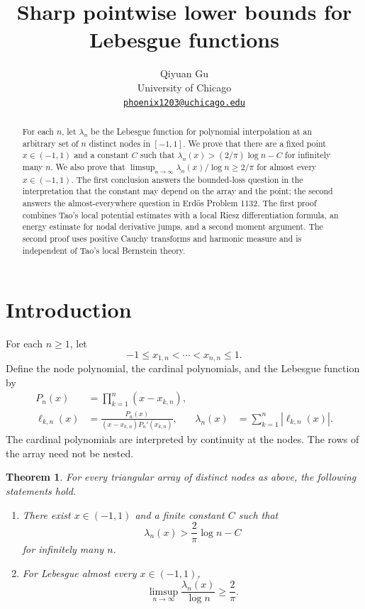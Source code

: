 \documentclass[11pt]{article}
\title{Sharp pointwise lower bounds for Lebesgue functions}
\author{Qiyuan Gu\\
University of Chicago\\
\href{mailto:phoenix1203@uchicago.edu}{\texttt{phoenix1203@uchicago.edu}}}
\date{}
\newtheorem{theorem}{Theorem}
\numberwithin{equation}{section}
\begin{document}
\maketitle

\begin{abstract}
For each \(n\), let \(\lambda_n\) be the Lebesgue function for
polynomial interpolation at an arbitrary set of \(n\) distinct nodes
in \([-1,1]\). We prove that there are a fixed point \(x\in(-1,1)\)
and a constant \(C\) such that
\(\lambda_n(x)>(2/\pi)\log n-C\) for infinitely many \(n\).
We also prove that
\(\limsup_{n\to\infty}\lambda_n(x)/\log n\ge 2/\pi\)
for almost every \(x\in(-1,1)\).
The first conclusion answers the bounded-loss question in the interpretation
that the constant may depend on the array and the point; the second answers
the almost-everywhere question in Erd\H{o}s Problem 1132. The first proof
combines Tao's local potential estimates with a local Riesz differentiation
formula, an energy estimate for nodal derivative jumps, and a second moment
argument. The second proof uses positive Cauchy transforms and harmonic
measure and is independent of Tao's local Bernstein theory.
\end{abstract}

\section{Introduction}

For each \(n\ge1\), let
\[
 -1\le x_{1,n}<\cdots<x_{n,n}\le1.
\]
Define the node polynomial, the cardinal polynomials, and the Lebesgue
function by
\begin{align*}
 P_n(x)&=\prod_{k=1}^n(x-x_{k,n}),\\
 \ell_{k,n}(x)&=\frac{P_n(x)}{(x-x_{k,n})P_n'(x_{k,n})},
 &\lambda_n(x)&=\sum_{k=1}^n|\ell_{k,n}(x)|.
\end{align*}
The cardinal polynomials are interpreted by continuity at the nodes.
The rows of the array need not be nested.

\begin{theorem}\label{thm:main}
For every triangular array of distinct nodes as above, the following
statements hold.
\begin{enumerate}
\item[(i)] There exist \(x\in(-1,1)\) and a finite constant \(C\) such that
\begin{equation}\label{eq:main-fixed}
 \lambda_n(x)>\frac2\pi\log n-C
\end{equation}
for infinitely many \(n\).
\item[(ii)] For Lebesgue almost every \(x\in(-1,1)\),
\begin{equation}\label{eq:main-ae}
 \limsup_{n\to\infty}\frac{\lambda_n(x)}{\log n}\ge\frac2\pi.
\end{equation}
\end{enumerate}
\end{theorem}
\end{document}
